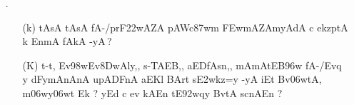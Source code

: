 \begin{itemize}
\begin{itemize}
               \item[({\dn R})] {\dn EC/E\306wt{\rs -\re}En,SkA@yynAEdk aASy\2 BvtA\2 \3FEwd\?f\? upl<y{\rs -\re}mAn\2 Bv\306wmtAsAr\?Z pyA\0\3D8w\2 n {\rs ?\re}}
                             
               \end{itemize}
               
  \item[{\dn \dnnum \rn{33}}.] \begin{itemize}
  
            \item[({\dn k})] {\dn tAsA\2 tAsA\2 fA-/prF\322wAZA\2 pAWc\387wm\? \3FEwmAZA\-myA\0dA c ekzptA k\2 EnmA\0\2 fAkA -yA\,{\rs ?\re}}
            
            \item[({\dn K})] {\dn t\4-t\4, Ev\398wEv\38DwAly\4,{\rs ,\re} s\2-TAEB,{\rs ,\re} aEDfAsn\4,{\rs ,\re} mAmAtEB\396w fA-/Evq\- y\? dFymAnAnA upADFnA aEKl\? BArt\? s\3E2wkz=y\2 -yA iEt Bv\306wtA, m\306wy\306wt\? Ek {\rs ?\re} yEd c ev kAEn tE\392wqy\? BvtA\2 s\2cnAEn {\rs ?\re} }
  
            \end{itemize}                                           
\end{itemize}

